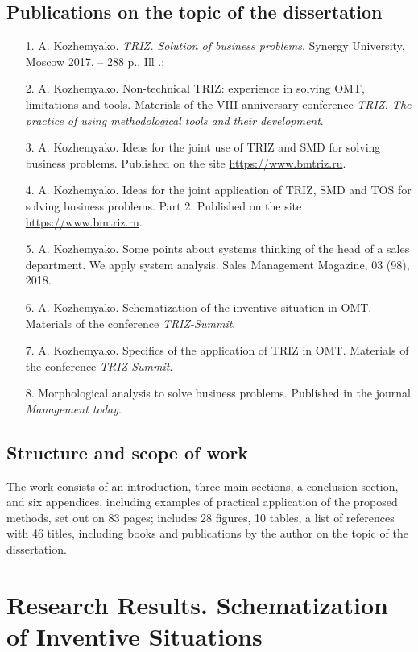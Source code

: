 \documentclass[11pt,a4paper]{book}
\begin{document}
\section{Publications on the topic of the dissertation}
\begin{itemize}
\item[1.] A. Kozhemyako. \emph{TRIZ. Solution of business problems}. 
  Synergy University, Moscow 2017. -- 288 p., Ill .;
\item[2.] A. Kozhemyako. Non-technical TRIZ: experience in solving
  OMT, limitations and tools. Materials of the
  VIII anniversary conference \emph{TRIZ. The practice of using methodological
    tools and their development}.
\item[3.] A. Kozhemyako. Ideas for the joint use of TRIZ and SMD for solving
  business problems. Published on the site \url{https://www.bmtriz.ru}.
\item[4.] A. Kozhemyako. Ideas for the joint application of TRIZ, SMD and TOS
  for solving business problems.  Part 2. Published on the site
  \url{https://www.bmtriz.ru}.
\item[5.] A. Kozhemyako. Some points about systems thinking of the head of a
  sales department.  We apply system analysis. Sales Management Magazine, 03
  (98), 2018.
\item[6.] A. Kozhemyako. Schematization of the inventive situation in
  OMT. Materials of the conference
  \emph{TRIZ-Summit}.
\item[7.] A. Kozhemyako. Specifics of the application of TRIZ in
  OMT. Materials of the conference
  \emph{TRIZ-Summit}.
\item[8.] Morphological analysis to solve business problems. Published in the
  journal \emph{Management today}.
\end{itemize}

\section{Structure and scope of work}
The work consists of an introduction, three main sections, a conclusion
section, and six appendices, including examples of practical application of
the proposed methods, set out on 83 pages; includes 28 figures, 10 tables, a
list of references with 46 titles, including books and publications by the
author on the topic of the dissertation.

\chapter[Research Results]{Research Results.
  Schematization of Inventive Situations}
\end{document}
